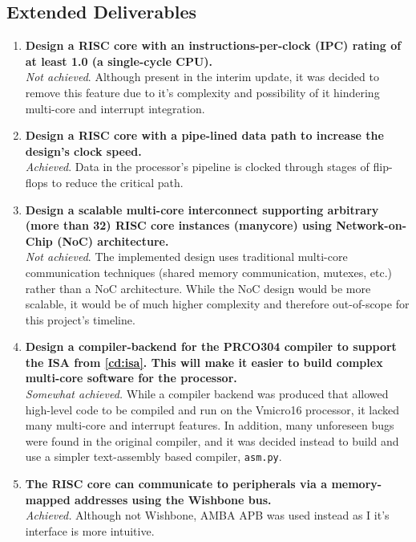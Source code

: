 \subsection{Extended Deliverables}
\begin{enumerate}[leftmargin=2\parindent, label=\bfseries ED\arabic*]

    \item{\textbf{Design a RISC core with an instructions-per-clock (IPC) rating of at least 1.0 (a single-cycle CPU).}\\
    \textit{Not achieved}. Although present in the interim update, it was decided to remove this feature due to it's complexity and possibility of it hindering multi-core and interrupt integration.
    }
    
    \item{\textbf{Design a RISC core with a pipe-lined data path to increase the design's clock speed.}\\
    \textit{Achieved}. Data in the processor's pipeline is clocked through stages of flip-flops to reduce the critical path.
    }
    
    \item{\textbf{Design a scalable multi-core interconnect supporting arbitrary (more than 32) RISC core instances (manycore) using Network-on-Chip (NoC) architecture.}\\
    \textit{Not achieved}. The implemented design uses traditional multi-core communication techniques (shared memory communication, mutexes, etc.) rather than a NoC architecture. While the NoC design would be more scalable, it would be of much higher complexity and therefore out-of-scope for this project's timeline.}
    
    \item{\textbf{Design a compiler-backend for the PRCO304 \cite{prco304} compiler to support the ISA from \ref{cd:isa}. This will make it easier to build complex multi-core software for the processor.}\\
    \textit{Somewhat achieved.} While a compiler backend was produced that allowed high-level code to be compiled and run on the Vmicro16 processor, it lacked many multi-core and interrupt features. In addition, many unforeseen bugs were found in the original compiler, and it was decided instead to build and use a simpler text-assembly based compiler, \verb|asm.py|.
    }
    \item{\textbf{The RISC core can communicate to peripherals via a memory-mapped addresses using the Wishbone bus.}\\
    \textit{Achieved.} Although not Wishbone, AMBA APB was used instead as I it's interface is more intuitive.}
    

\end{enumerate}
